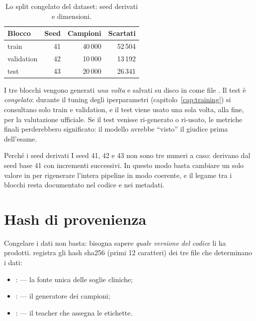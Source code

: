 \begin{table}[h]
\centering
\caption{Lo split congelato del dataset: seed derivati e dimensioni.}
\label{tab:split-riproducibilita}
\begin{tabular}{lrrr}
\toprule
\textbf{Blocco} & \textbf{Seed} & \textbf{Campioni} & \textbf{Scartati} \\
\midrule
train & 41 & 40\,000 & 52\,504 \\
validation & 42 & 10\,000 & 13\,192 \\
test & 43 & 20\,000 & 26\,341 \\
\bottomrule
\end{tabular}
\end{table}

I tre blocchi vengono generati \emph{una volta} e salvati su disco in
 come file . Il test è \emph{congelato}:
durante il tuning degli iperparametri (capitolo~\ref{cap:training}) si
consultano solo train e validation, e il test viene usato una sola volta,
alla fine, per la valutazione ufficiale. Se il test venisse ri-generato o
ri-usato, le metriche finali perderebbero significato: il modello avrebbe
``visto'' il giudice prima dell'esame.

\begin{esempio}{Perché i seed derivati}
I seed 41, 42 e 43 non sono tre numeri a caso: derivano dal seed base 41
con incrementi successivi. In questo modo basta cambiare un solo valore in
 per rigenerare l'intera pipeline in modo coerente, e il
legame tra i blocchi resta documentato nel codice e nei metadati.
\end{esempio}

\section{Hash di provenienza}\label{sec:hash-provenienza}

Congelare i dati non basta: bisogna sapere \emph{quale versione del codice}
li ha prodotti.  registra gli hash
sha256 (primi 12 caratteri) dei tre file che determinano i dati:

\begin{itemize}
  \item {}:  — la fonte
        unica delle soglie cliniche;
  \item {}:  — il
        generatore dei campioni;
  \item {}:  — il teacher
        che assegna le etichette.
\end{itemize}

